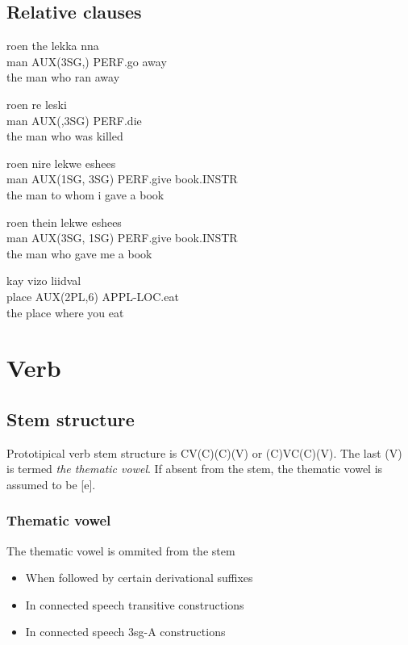 \documentclass[8pt]{book}
\begin{document}
\section{Relative clauses}

\begin{exe}
\ex
\gll roen the lekka nna \\
 man AUX(3SG,) PERF.go away \\
\trans the man who ran away

\ex
\gll roen re leski \\
man AUX(,3SG) PERF.die \\
\trans the man who was killed


\ex
\gll roen nire lekwe eshees \\
man AUX(1SG, 3SG) PERF.give book.INSTR \\
\trans the man to whom i gave a book

\ex
\gll roen thein lekwe eshees \\
man AUX(3SG, 1SG) PERF.give book.INSTR \\
\trans the man who gave me a book

\ex
\gll kay vizo liidval \\
place AUX(2PL,6) APPL-LOC.eat \\
\trans the place where you eat
\end{exe}



\chapter{Verb}

\section{Stem structure}

Prototipical verb stem structure is CV(C)(C)(V) or (C)VC(C)(V). The last (V) is termed \textit{the thematic vowel}. If absent from the stem, the thematic vowel is assumed to be [e].

\subsection{Thematic vowel}
The thematic vowel is ommited from the stem
\begin{itemize}
	\item When followed by certain derivational suffixes
	\item In connected speech transitive constructions
	\item In connected speech 3sg-A constructions
\end{itemize}
\end{document}
